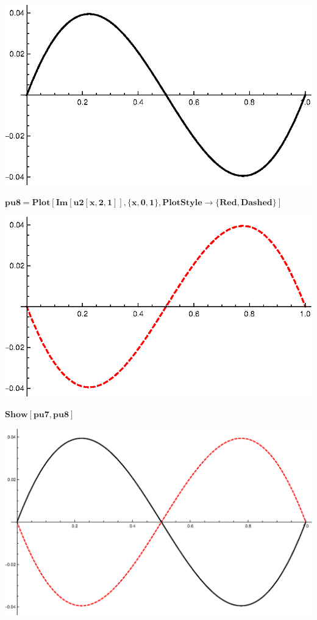 {\includegraphics{chapters/appendices/KP_Mathematica/Kronig_Penney_model_transfer_matrix_gr17.eps}

\begin{doublespace}
\noindent\(\pmb{\text{pu8}=\text{Plot}[\text{Im}[\text{u2}[x,2,1]],\{x,0,1\},\text{PlotStyle}\to \{\text{Red},\text{Dashed}\}]}\)
\end{doublespace}

\includegraphics{chapters/appendices/KP_Mathematica/Kronig_Penney_model_transfer_matrix_gr18.eps}

\begin{doublespace}
\noindent\(\pmb{\text{Show}[\text{pu7},\text{pu8}]}\)
\end{doublespace}

\includegraphics{chapters/appendices/KP_Mathematica/Kronig_Penney_model_transfer_matrix_gr19.eps}

}
